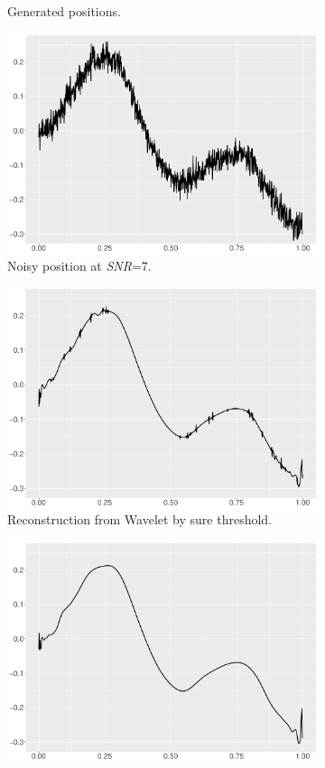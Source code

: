 \begin{figure}
\begin{subfigure}{0.45\textwidth}
    \caption{Generated positions.}
    \end{subfigure}
    \begin{subfigure}{0.45\textwidth}
    \centering
    \includegraphics[width=\linewidth,height=0.45\textwidth]{Chapters/02TractorSplineTheory/plot/ggplot/ggHeaviSinePositionNoise.pdf}
    \caption{Noisy position at \textit{SNR}=7.}
    \end{subfigure}
    \begin{subfigure}{0.45\textwidth}
    \centering
    \includegraphics[width=\linewidth,height=0.45\textwidth]{Chapters/02TractorSplineTheory/plot/ggplot/ggHeaviSineSure.pdf}
    \caption{Reconstruction from Wavelet by sure threshold.}
    \end{subfigure}
    \begin{subfigure}{0.45\textwidth}
    \centering
    \includegraphics[width=\linewidth,height=0.45\textwidth]{Chapters/02TractorSplineTheory/plot/ggplot/ggHeaviSineBayes.pdf}

\end{subfigure}
\end{figure}
